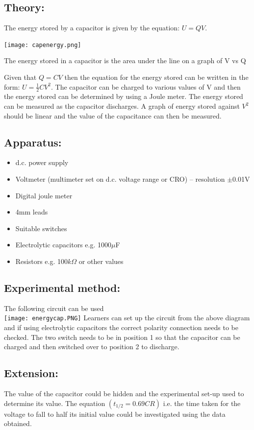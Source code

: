 \subsection{Theory:}
The energy stored by a capacitor is given by the equation: \(U=QV\). \begin{marginfigure}
\texttt{[image: capenergy.png]}
\caption{The energy stored in a capacitor is the area under the line on a graph of V vs Q}
\end{marginfigure} 
Given that \(Q=CV\) then the equation for the energy stored can be written in the form: \(U=\frac{1}{2} CV^{2}\). The capacitor can be charged to various values of V and then the energy stored can be determined by using a Joule meter. The energy stored can be measured as the capacitor discharges. A graph of energy stored against \(V^{2}\) should be linear and the value of the capacitance can then be measured.
\subsection{Apparatus:}

\begin{itemize}
	\item d.c. power supply
	\item Voltmeter (multimeter set on d.c. voltage range or CRO) – resolution $\pm$0.01V
	\item Digital joule meter
	\item 4mm leads
	\item Suitable switches
	\item Electrolytic capacitors e.g. 1000$\mu$F 
	\item Resistors e.g. 100$k \Omega$ or other values
\end{itemize}

\subsection{Experimental method:}
The following circuit can be used \\
\texttt{[image: energycap.PNG]}
Learners can set up the circuit from the above diagram and if using electrolytic capacitors the correct polarity connection needs to be checked. The two switch needs to be in position 1 so that the capacitor can be charged and then switched over to position 2 to discharge.
\subsection{Extension:}
The value of the capacitor could be hidden and the experimental set-up used to determine its value.
The equation \( (t_{1/2}=0.69CR) \) i.e. the time taken for the voltage to fall to half its initial value could be investigated using the data obtained.


